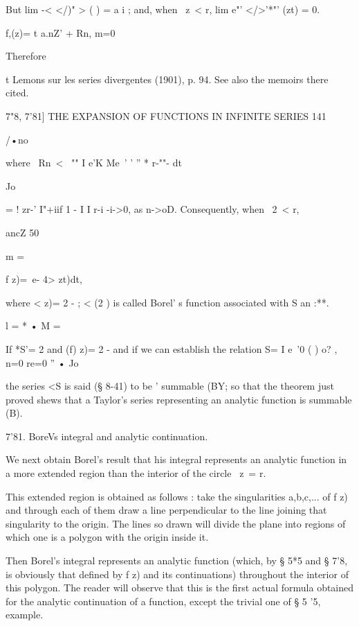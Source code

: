 {But lim -< </)" > ( ) = a i ; and, when \ z\ < r, lim e"' </>'*"' (zt)
= 0.



f,(z)= t a.nZ' + Rn, m=0



Therefore

t Lemons sur les series divergentes (1901), p. 94. See also the
memoirs there cited.



7"8, 7'81] THE EXPANSION OF FUNCTIONS IN INFINITE SERIES 141

/•no

where \ Rn\ < \ "" I e'K Me\ ' ' '' * r-""- dt

Jo

= ! zr-' I"+iif 1 - I I r-i -i->0, as n->oD. Consequently, when \ 2\ <
r,



ancZ 50



m =

f z)=\ e- 4> zt)dt,



where < z)= 2 - ; < (2 ) is called Borel' s function associated with S
an :**.

 l = * • M =



If *S'= 2 and (f) z)= 2 - and if we can establish the relation S= I
e~'0 ( ) o? , n=0 re=0 '' • Jo

the series <S is said (§ 8-41) to be ' summable (BY; so that the
theorem just proved shews that a Taylor's series representing an
analytic function is summable (B).

7'81. BoreVs integral and analytic continuation.

We next obtain Borel's result that his integral represents an analytic
function in a more extended region than the interior of the circle \
z\ = r.




This extended region is obtained as follows : take the singularities
a,b,c,... of f z) and through each of them draw a line perpendicular
to the line joining that singularity to the origin. The lines so drawn
will divide the plane into regions of which one is a polygon with the
origin inside it.

Then Borel's integral represents an analytic function (which, by § 5*5
and § 7'8, is obviously that defined by f z) and its continuations)
throughout the interior of this polygon. The reader will observe that
this is the first actual formula obtained for the analytic
continuation of a function, except the trivial one of § 5 '5, example.

}
